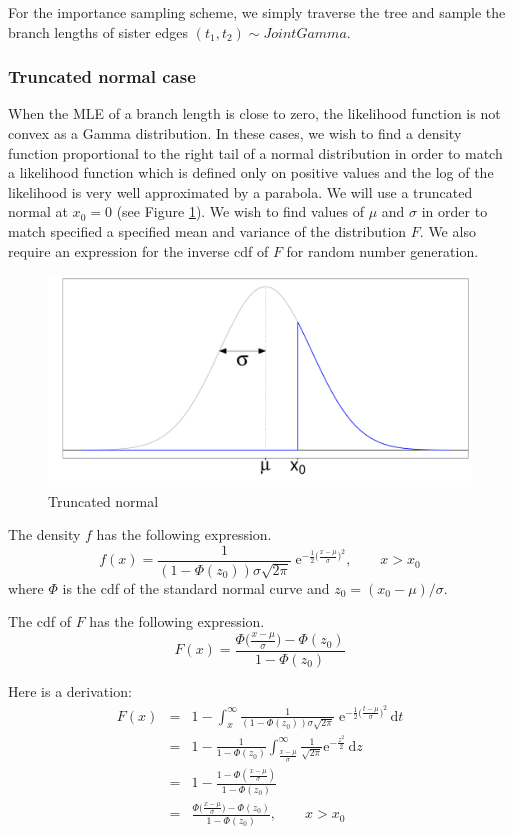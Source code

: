 \documentclass[useAMS,usenatbib]{biom}
\begin{document}
For the importance sampling scheme, we simply traverse the tree and
sample the branch lengths of sister edges $(t_1,t_2) \sim Joint
Gamma$.

\subsubsection{Truncated normal case}
When the MLE of a branch length is close to zero, the likelihood
function is not convex as a Gamma distribution.  In these cases, we
wish to find a density function proportional to the right tail of a
normal distribution in order to match a likelihood function which is
defined only on positive values and the log of the likelihood is very
well approximated by a parabola. We will use a truncated normal at
$x_0=0$ (see Figure \ref{trun-norm}). We wish to find values of $\mu$
and $\sigma$ in order to match specified a specified mean and variance
of the distribution $F$.  We also require an expression for the
inverse cdf of $F$ for random number generation.
\begin{figure}
\centering
\includegraphics[scale=0.35]{figures/truncated-normal.pdf}
\caption{Truncated normal}
\label{trun-norm}
\end{figure}

The density $f$ has the following expression.
$$
f(x) = \frac{1}{(1 - \Phi(z_0))\sigma\sqrt{2\pi}}\;
\mathrm{e}^{-\frac{1}{2}\big(\frac{x-\mu}{\sigma}\big)^2}, \qquad x >
x_0
$$
where $\Phi$ is the cdf of the standard normal curve and $z_0 = (x_0-\mu)/\sigma$.

The cdf of $F$ has the following expression.
$$
F(x) =
\frac{\Phi\big(\frac{x-\mu}{\sigma}\big)-\Phi(z_0)}{1-\Phi(z_0)}
$$

Here is a derivation:
\begin{eqnarray*}
F(x) & = & 1 - \int_x^\infty \frac{1}{(1 - \Phi(z_0))\sigma\sqrt{2\pi}}\;
\mathrm{e}^{-\frac{1}{2}\big(\frac{t-\mu}{\sigma}\big)^2} \,\mathrm{d}t \\
& = & 1 - \frac{1}{1 - \Phi(z_0)}
\int_{\frac{x-\mu}{\sigma}}^\infty \frac{1}{\sqrt{2\pi}}
\mathrm{e}^{-\frac{z^2}{2}}\, \mathrm{d}z \\
& = & 1 - \frac{1 - \Phi(\frac{x-\mu}{\sigma})}{1 - \Phi(z_0)} \\
& = & \frac{\Phi\big(\frac{x-\mu}{\sigma}\big)-\Phi(z_0)}{1-\Phi(z_0)}, \qquad x > x_0
\end{eqnarray*}
\end{document}
